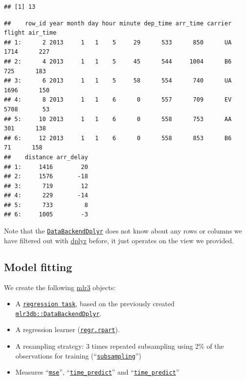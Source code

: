 \documentclass[]{scrbook}
\newenvironment{Shaded}{\begin{snugshade}}{\end{snugshade}}
\newcommand{\KeywordTok}[1]{\textcolor[rgb]{0.13,0.29,0.53}{\textbf{#1}}}
\newcommand{\NormalTok}[1]{#1}
\newcommand{\OperatorTok}[1]{\textcolor[rgb]{0.81,0.36,0.00}{\textbf{#1}}}
\providecommand{\tightlist}{%
  \setlength{\itemsep}{0pt}\setlength{\parskip}{0pt}}
\renewenvironment{Shaded} {\begin{snugshade}\small} {\end{snugshade}}
\begin{document}
\begin{verbatim}
## [1] 13
\end{verbatim}

\begin{Shaded}
\end{Shaded}

\begin{verbatim}
##    row_id year month day hour minute dep_time arr_time carrier flight air_time
## 1:      2 2013     1   1    5     29      533      850      UA   1714      227
## 2:      4 2013     1   1    5     45      544     1004      B6    725      183
## 3:      6 2013     1   1    5     58      554      740      UA   1696      150
## 4:      8 2013     1   1    6      0      557      709      EV   5708       53
## 5:     10 2013     1   1    6      0      558      753      AA    301      138
## 6:     12 2013     1   1    6      0      558      853      B6     71      158
##    distance arr_delay
## 1:     1416        20
## 2:     1576       -18
## 3:      719        12
## 4:      229       -14
## 5:      733         8
## 6:     1005        -3
\end{verbatim}

Note that the \href{https://mlr3db.mlr-org.com/reference/DataBackendDplyr.html}{\texttt{DataBackendDplyr}} does not know about any rows or columns we have filtered out with \href{https://cran.r-project.org/package=dplyr}{dplyr} before, it just operates on the view we provided.

\hypertarget{model-fitting}{%
\subsection{Model fitting}\label{model-fitting}}

We create the following \href{https://mlr3.mlr-org.com}{mlr3} objects:

\begin{itemize}
\tightlist
\item
  A \href{https://mlr3.mlr-org.com/reference/TaskRegr.html}{\texttt{regression\ task}}, based on the previously created \href{https://mlr3db.mlr-org.com/reference/DataBackendDplyr.html}{\texttt{mlr3db::DataBackendDplyr}}.
\item
  A regression learner (\href{https://mlr3.mlr-org.com/reference/mlr_learners_regr.rpart.html}{\texttt{regr.rpart}}).
\item
  A resampling strategy: 3 times repeated subsampling using 2\% of the observations for training (``\href{https://mlr3.mlr-org.com/reference/mlr_resamplings_subsampling.html}{\texttt{subsampling}}'')
\item
  Measures ``\href{https://mlr3.mlr-org.com/reference/mlr_measures_regr.mse.html}{\texttt{mse}}'', ``\href{https://mlr3.mlr-org.com/reference/mlr_measures_elapsed_time.html}{\texttt{time\_predict}}'' and ``\href{https://mlr3.mlr-org.com/reference/mlr_measures_elapsed_time.html}{\texttt{time\_predict}}''
\end{itemize}
\end{document}
